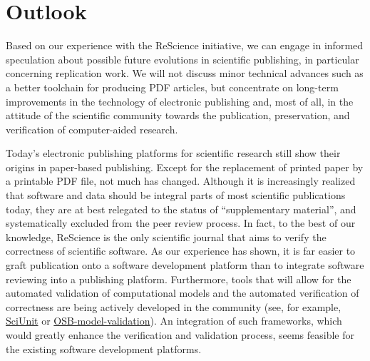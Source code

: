 \documentclass[a4paper,10pt, twocolumn]{article}
\begin{document}
\section*{Outlook}

Based on our experience with the ReScience initiative, we can engage
in informed speculation about possible future evolutions in scientific
publishing, in particular concerning replication work. We will not
discuss minor technical advances such as a better toolchain for
producing PDF articles, but concentrate on long-term improvements in
the technology of electronic publishing and, most of all, in the
attitude of the scientific community towards the publication,
preservation, and verification of computer-aided research.


Today's electronic publishing platforms for scientific research still
show their origins in paper-based publishing. Except for the
replacement of printed paper by a printable PDF file, not much has
changed. Although it is increasingly realized that software and data
should be integral parts of most scientific publications today, they
are at best relegated to the status of ``supplementary material'', and
systematically excluded from the peer review process. In fact, to the
best of our knowledge, ReScience is the only scientific journal that
aims to verify the correctness of scientific software. As our
experience has shown, it is far easier to graft publication onto a
software development platform than to integrate software reviewing
into a publishing platform. Furthermore, tools that will allow for the automated
validation of computational models and the automated verification of correctness are being actively 
developed in the community (see, for example, 
\href{https://github.com/scidash/sciunit}{SciUnit} or 
\href{https://github.com/OpenSourceBrain/osb-model-validation}{OSB-model-validation}). 
An integration of such frameworks, which would greatly enhance the 
verification and validation process, seems feasible for the existing software 
development platforms.
\end{document}
